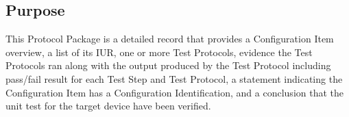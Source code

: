 \subsection{Purpose}
This Protocol Package is a detailed record that provides a Configuration Item
overview, a list of its IUR, one or more Test Protocols, evidence the Test
Protocols ran along with the output produced by the Test Protocol including
pass/fail result for each Test Step and Test Protocol, a statement indicating
the Configuration Item has a Configuration Identification, and a conclusion
that the unit test for the target device have been verified.
